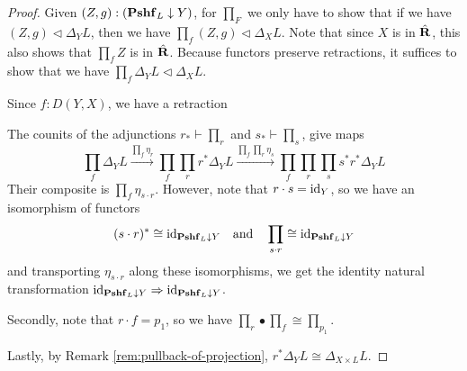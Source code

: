 \begin{proof}
  Given $ (Z, g) : (\mathbf{Pshf}_{L} \downarrow Y) $, for $ \prod_F $ we only have to show that if we have $ (Z, g) \triangleleft \Delta_Y L $, then we have $ \prod_f(Z, g) \triangleleft \Delta_X L $. Note that since $ X $ is in $ \hat {\mathbf{R}} $, this also shows that $ \prod_f Z $ is in $ \hat {\mathbf{R}} $. Because functors preserve retractions, it suffices to show that we have $ \prod_f \Delta_Y L \triangleleft \Delta_X L $.

  Since $ f : D(Y, X) $, we have a retraction
  \begin{center}
  \end{center}

  The counits of the adjunctions $ r_* \vdash \prod_r $ and $ s_* \vdash \prod_s $, give maps
  \[
    \prod_f \Delta_Y L \xrightarrow{\prod_f \eta_r}
    \prod_f \prod_r r^* \Delta_Y L \xrightarrow{\prod_f \prod_r \eta_s}
    \prod_f \prod_r \prod_s s^* r^* \Delta_Y L
  \]
  Their composite is $ \prod_f \eta_{s \cdot r} $. However, note that $ r \cdot s = \text{id}_{Y} $, so we have an isomorphism of functors
  \[ (s \cdot r)^* \cong \text{id}_{\mathbf{Pshf}_{L} \downarrow Y} \quad \text{and} \quad \prod_{s \cdot r} \cong \text{id}_{\mathbf{Pshf}_{L} \downarrow Y} \]
  and transporting $ \eta_{s \cdot r} $ along these isomorphisms, we get the identity natural transformation $ \text{id}_{\mathbf{Pshf}_{L} \downarrow Y} \Rightarrow \text{id}_{\mathbf{Pshf}_{L} \downarrow Y} $.

  Secondly, note that $ r \cdot f = p_1 $, so we have $ \prod_r \bullet \prod_f \cong \prod_{p_1} $.

  Lastly, by Remark \ref{rem:pullback-of-projection}, $ r^* \Delta_Y L \cong \Delta_{X \times L} L $.


\end{proof}
